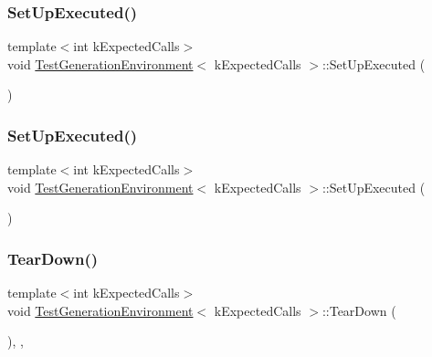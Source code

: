 \subsubsection{\texorpdfstring{SetUpExecuted()}{SetUpExecuted()}\hspace{0.1cm}{\footnotesize\ttfamily [2/3]}}
{\footnotesize\ttfamily template$<$int k\+Expected\+Calls$>$ \\
void \mbox{\hyperlink{class_test_generation_environment}{Test\+Generation\+Environment}}$<$ k\+Expected\+Calls $>$\+::Set\+Up\+Executed (\begin{DoxyParamCaption}{ }\end{DoxyParamCaption})\hspace{0.3cm}{\ttfamily [inline]}}

\mbox{\label{class_test_generation_environment_aa17c620af5eb9929bdbde25820cd8e28}} 
\subsubsection{\texorpdfstring{SetUpExecuted()}{SetUpExecuted()}\hspace{0.1cm}{\footnotesize\ttfamily [3/3]}}
{\footnotesize\ttfamily template$<$int k\+Expected\+Calls$>$ \\
void \mbox{\hyperlink{class_test_generation_environment}{Test\+Generation\+Environment}}$<$ k\+Expected\+Calls $>$\+::Set\+Up\+Executed (\begin{DoxyParamCaption}{ }\end{DoxyParamCaption})\hspace{0.3cm}{\ttfamily [inline]}}

\mbox{\label{class_test_generation_environment_af7731d3161d89e3bd456cd204e2c4890}} 
\subsubsection{\texorpdfstring{TearDown()}{TearDown()}\hspace{0.1cm}{\footnotesize\ttfamily [1/3]}}
{\footnotesize\ttfamily template$<$int k\+Expected\+Calls$>$ \\
void \mbox{\hyperlink{class_test_generation_environment}{Test\+Generation\+Environment}}$<$ k\+Expected\+Calls $>$\+::Tear\+Down (\begin{DoxyParamCaption}{ }\end{DoxyParamCaption})\hspace{0.3cm}{\ttfamily [inline]}, {\ttfamily [override]}, {\ttfamily [virtual]}}



